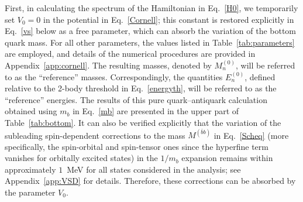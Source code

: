 \documentclass[aps,prd,showpacs,amsmath,twocolumn,superscriptaddress,floatfix,nofootinbib,notitlepage]{revtex4-2}
\newcommand{\Mbb}{M^{(\bar{b}b)}}
\begin{document}
First, in calculating the spectrum of the Hamiltonian in Eq.~\eqref{H0}, we temporarily set $V_0=0$ in the potential in Eq.~\eqref{Cornell}; this constant is restored explicitly in Eq.~\eqref{vs} below as a free parameter, which can absorb the variation of the bottom quark mass. For all other parameters, the values listed in Table~\ref{tab:parameters} are employed, and details of the numerical procedures are provided in Appendix~\ref{app:cornell}. 
The resulting masses, denoted by $M_n^{(0)}$, will be referred to as the ``reference'' masses. Correspondingly, the quantities $E_n^{(0)}$, defined relative to the 2-body threshold in Eq.~\eqref{energyth}, will be referred to as the ``reference'' energies. The results of this pure quark--antiquark calculation obtained using $m_b$ in Eq.~\eqref{mb} are presented in the upper part of Table~\ref{tab:bottom}.
It can also be verified explicitly that the variation of the subleading spin-dependent corrections to the mass $\Mbb$ in Eq.~\eqref{Scheq} (more specifically, the spin-orbital and spin-tensor ones since the hyperfine term vanishes for orbitally excited states) in the $1/m_b$ expansion \cite{Eichten:1980mw,Gromes:1984ma} remains within approximately $1$~MeV for all states considered in the analysis; see Appendix~\ref{app:VSD} for details. Therefore, these corrections can be absorbed by the parameter $V_0$.
\end{document}

